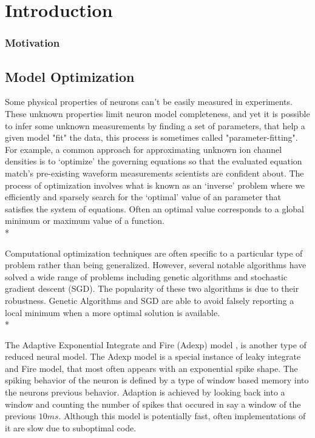 
\section{Introduction}

\subsubsection{Motivation}



\subsection{Model Optimization}

Some physical properties of neurons can’t be easily measured in experiments. These unknown properties limit neuron model completeness, and yet it is possible to infer some unknown measurements by  finding a set of parameters, that help a given model "fit" the data, this process is sometimes called "parameter-fitting". For example, a common approach for approximating unknown ion channel densities is to ‘optimize’ the governing equations so that the evaluated equation  match's pre-existing waveform measurements scientists are confident about. The process of optimization involves what is known as an ‘inverse’ problem where we efficiently and sparsely search for the ‘optimal’ value of an parameter that satisfies the system of equations. Often an optimal value corresponds to a global minimum or maximum value of a function.\\*
 
Computational optimization techniques are often specific to a particular type of problem rather than being generalized. However, several notable algorithms have solved a wide range of problems including genetic algorithms and stochastic gradient descent (SGD). The popularity of these two algorithms is due to their robustness. Genetic Algorithms and SGD are able to avoid falsely reporting a local minimum when a more optimal solution is available.\\*


The Adaptive Exponential Integrate and Fire (Adexp) model \cite{brette2005adaptive}, is another type of reduced neural model. The Adexp model is a special instance of leaky integrate and Fire model, that most often appears with an exponential spike shape. The spiking behavior of the neuron is defined by a type of window based memory into the neurons previous behavior. Adaption is achieved by looking back into a window and counting the number of spikes that occured in say a window of the previous $10ms$. Although this model is potentially fast, often implementations of it are slow due to suboptimal code.\\
\\


